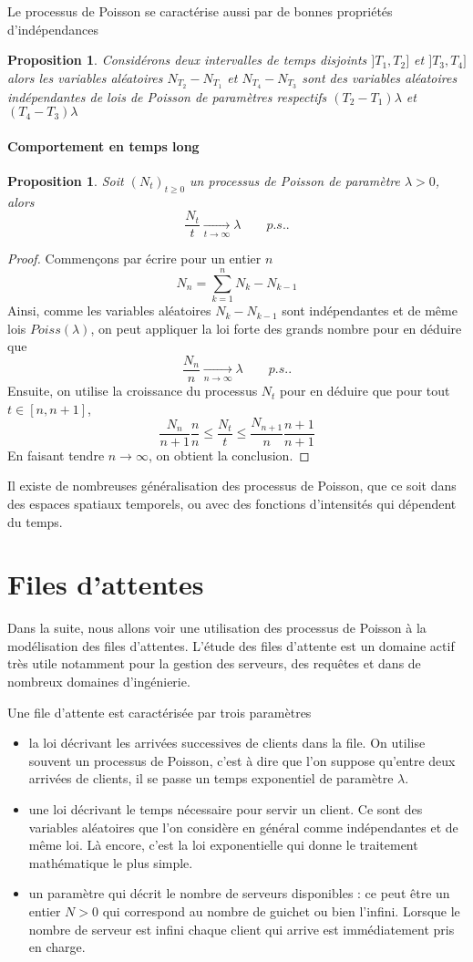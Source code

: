 \documentclass[a4paper,12pt]{book}
\newtheorem{propfr}[thmfr]{Proposition}
\begin{document}
Le processus de Poisson se caractérise aussi par de bonnes propriétés d'indépendances
\begin{propfr}Considérons deux intervalles de temps disjoints $]T_1, T_2]$ et $]T_3,T_4]$ alors les variables aléatoires $N_{T_2}-N_{T_1}$ et $N_{T_4}-N_{T_3}$ sont des variables aléatoires indépendantes de lois de Poisson de paramètres respectifs $(T_2-T_1)\lambda $ et $(T_4-T_3)\lambda$
\end{propfr}

\paragraph{Comportement en temps long}
\begin{propfr}
Soit $(N_t)_{t\ge0}$ un processus de Poisson de paramètre $\lambda>0$, alors $$\frac{N_t}{t} \underset{t\to\infty}{\longrightarrow} \lambda\qquad p.s. .$$
\end{propfr}
\begin{proof}
Commençons par écrire pour un entier $n$
$$N_n=\sum_{k=1}^n N_k-N_{k-1}$$
Ainsi, comme les variables aléatoires $N_k-N_{k-1}$ sont indépendantes et de même lois $Poiss(\lambda)$, on peut appliquer la loi forte des grands nombre pour en déduire que $$\frac{N_n}{n}\underset{n\to\infty}{\longrightarrow} \lambda\qquad p.s..$$
Ensuite, on utilise la croissance du processus $N_t$ pour en déduire que pour tout $t\in[n,n+1]$,
$$\frac{N_n}{n+1}\frac{n}{n}\le \frac{N_t}{t} \le\frac{ N_{n+1}}{n}\frac{n+1}{n+1}$$
En faisant tendre $n\to\infty$, on obtient la conclusion.
\end{proof}

Il existe de nombreuses généralisation des processus de Poisson, que ce soit dans des espaces spatiaux temporels, ou avec des fonctions d'intensités qui dépendent du temps.
\section{Files d'attentes}
Dans la suite, nous allons voir une utilisation des processus de Poisson à la modélisation des files d'attentes. L'étude des files d'attente est un domaine actif très utile notamment pour la gestion des serveurs, des requêtes et dans de nombreux domaines d'ingénierie.

Une file d'attente est caractérisée par trois paramètres
\begin{itemize}
\item la loi décrivant les arrivées successives de clients dans la file. On utilise souvent un processus de Poisson, c'est à dire que l'on suppose qu'entre deux arrivées de clients, il se passe un temps exponentiel de paramètre $\lambda$.
\item une loi décrivant le temps nécessaire pour servir un client. Ce sont des variables aléatoires que l'on considère en général comme indépendantes et de même loi. Là encore, c'est la loi exponentielle qui donne le traitement mathématique le plus simple.
\item un paramètre qui décrit le nombre de serveurs disponibles : ce peut être un entier $N>0$ qui correspond au nombre de guichet ou bien l'infini. Lorsque le nombre de serveur est infini chaque client qui arrive est immédiatement pris en charge.
\end{itemize}\medskip
\end{document}
